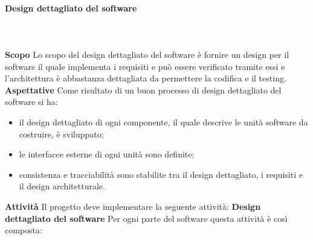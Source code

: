 			\paragraph{Design dettagliato del software} \mbox{}\\ \mbox{}\\
			\textbf{Scopo}\newline \newline
			Lo scopo del design dettagliato del software è fornire un design per il software il quale implementa i requisiti e può essere verificato tramite essi e l'architettura è abbastanza dettagliata da permettere la codifica e il testing.\newline \newline
			\textbf{Aspettative}\newline \newline
			Come risultato di un buon processo di design dettagliato del software si ha:
			\begin{itemize}
			\item il design dettagliato di ogni componente, il quale descrive le unità software da costruire, è sviluppato;
			\item le interfacce esterne di ogni unità sono definite;
			\item consistenza e tracciabilità sono stabilite tra il design dettagliato, i requisiti e il design architetturale.
			\end{itemize}
			\textbf{Attività}\newline \newline
			Il progetto deve implementare la seguente attività:\newline \newline
			\textbf{Design dettagliato del software}\newline \newline
			Per ogni parte del software questa attività è così composta:
